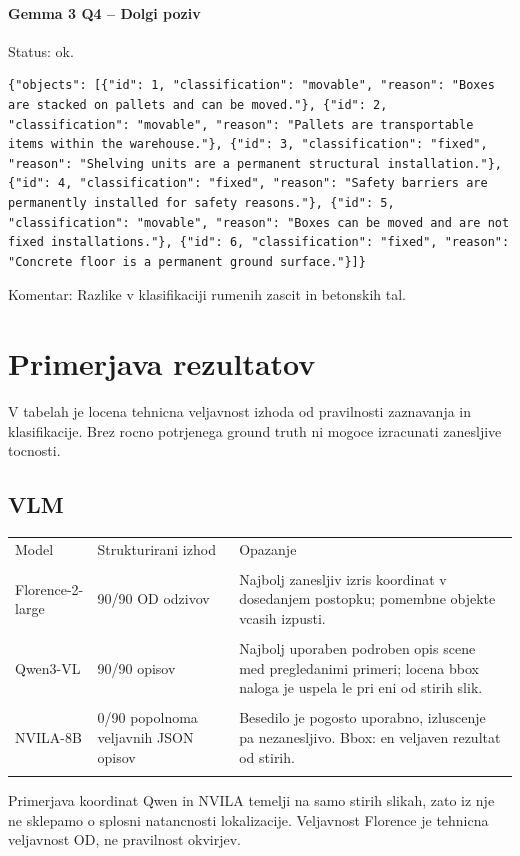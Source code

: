 \paragraph{Gemma 3 Q4 -- Dolgi poziv}
Status: ok. 
\begin{lstlisting}
{"objects": [{"id": 1, "classification": "movable", "reason": "Boxes are stacked on pallets and can be moved."}, {"id": 2, "classification": "movable", "reason": "Pallets are transportable items within the warehouse."}, {"id": 3, "classification": "fixed", "reason": "Shelving units are a permanent structural installation."}, {"id": 4, "classification": "fixed", "reason": "Safety barriers are permanently installed for safety reasons."}, {"id": 5, "classification": "movable", "reason": "Boxes can be moved and are not fixed installations."}, {"id": 6, "classification": "fixed", "reason": "Concrete floor is a permanent ground surface."}]}
\end{lstlisting}
Komentar: Razlike v klasifikaciji rumenih zascit in betonskih tal.
\clearpage
\section{Primerjava rezultatov}
V tabelah je locena tehnicna veljavnost izhoda od pravilnosti zaznavanja in klasifikacije. Brez rocno potrjenega ground truth ni mogoce izracunati zanesljive tocnosti.
\subsection{VLM}
\begin{tabular}{|p{3.2cm}|p{3.3cm}|p{7.0cm}|}
\hline Model & Strukturirani izhod & Opazanje \\\\ \hline
Florence-2-large & 90/90 OD odzivov & Najbolj zanesljiv izris koordinat v dosedanjem postopku; pomembne objekte vcasih izpusti. \\\\ \hline
Qwen3-VL & 90/90 opisov & Najbolj uporaben podroben opis scene med pregledanimi primeri; locena bbox naloga je uspela le pri eni od stirih slik. \\\\ \hline
NVILA-8B & 0/90 popolnoma veljavnih JSON opisov & Besedilo je pogosto uporabno, izluscenje pa nezanesljivo. Bbox: en veljaven rezultat od stirih. \\\\ \hline
\end{tabular}
Primerjava koordinat Qwen in NVILA temelji na samo stirih slikah, zato iz nje ne sklepamo o splosni natancnosti lokalizacije. Veljavnost Florence je tehnicna veljavnost OD, ne pravilnost okvirjev.

